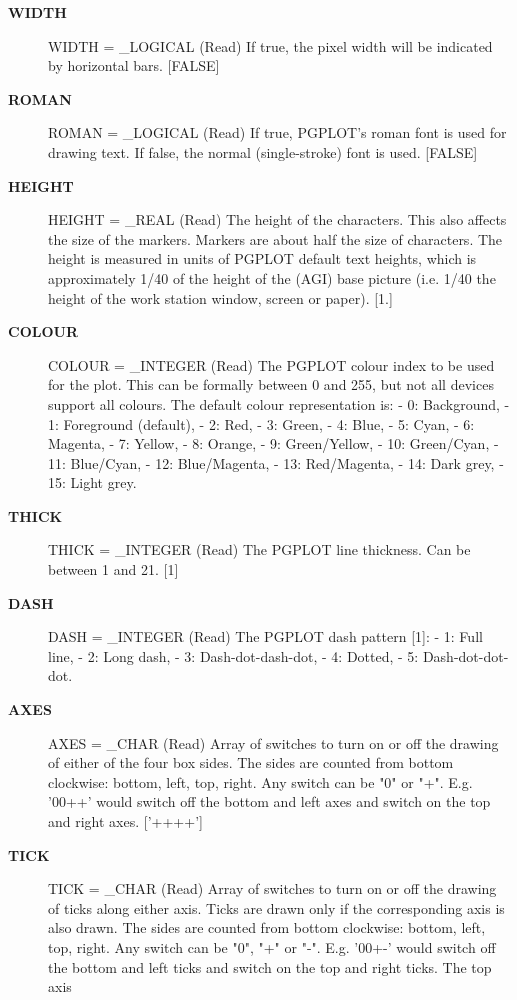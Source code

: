 \begin{description}
\begin{description}
\item [{\bf WIDTH}]
WIDTH = _LOGICAL (Read)
   If true, the pixel width will be indicated by horizontal bars.
   [FALSE]
\item [{\bf ROMAN}]
ROMAN = _LOGICAL (Read)
   If true, PGPLOT's roman font is used for drawing text. If
   false, the normal (single-stroke) font is used. [FALSE]
\item [{\bf HEIGHT}]
HEIGHT = _REAL (Read)
   The height of the characters. This also affects the size of the
   markers. Markers are about half the size of characters. The
   height is measured in units of PGPLOT default text heights,
   which is approximately 1/40 of the height of the (AGI) base
   picture (i.e. 1/40 the height of the work station window, screen
   or paper). [1.]
\item [{\bf COLOUR}]
COLOUR = _INTEGER (Read)
   The PGPLOT colour index to be used for the plot. This can be
   formally between 0 and 255, but not all devices support all
   colours. The default colour representation is:
   -  0: Background,           -  1: Foreground (default),
   -  2: Red,                  -  3: Green,
   -  4: Blue,                 -  5: Cyan,
   -  6: Magenta,              -  7: Yellow,
   -  8: Orange,               -  9: Green/Yellow,
   - 10: Green/Cyan,           - 11: Blue/Cyan,
   - 12: Blue/Magenta,         - 13: Red/Magenta,
   - 14: Dark grey,            - 15: Light grey.
\item [{\bf THICK}]
THICK = _INTEGER (Read)
   The PGPLOT line thickness. Can be between 1 and 21. [1]
\item [{\bf DASH}]
DASH = _INTEGER (Read)
   The PGPLOT dash pattern [1]:
   -  1: Full line,
   -  2: Long dash,
   -  3: Dash-dot-dash-dot,
   -  4: Dotted,
   -  5: Dash-dot-dot-dot.
\item [{\bf AXES}]
AXES = _CHAR (Read)
   Array of switches to turn on or off the drawing of either of
   the four box sides. The sides are counted from bottom
   clockwise: bottom, left, top, right. Any switch can be
   "0" or "+". E.g. '00++' would switch off the bottom and left
   axes and switch on the top and right axes. ['++++']
\item [{\bf TICK}]
TICK = _CHAR (Read)
   Array of switches to turn on or off the drawing of ticks along
   either axis. Ticks are drawn only if the corresponding axis is
   also drawn. The sides are counted from bottom
   clockwise: bottom, left, top, right. Any switch can be
   "0", "+" or "-". E.g. '00+-' would switch off the bottom and
   left ticks and switch on the top and right ticks. The top axis

\end{description}
\end{description}
